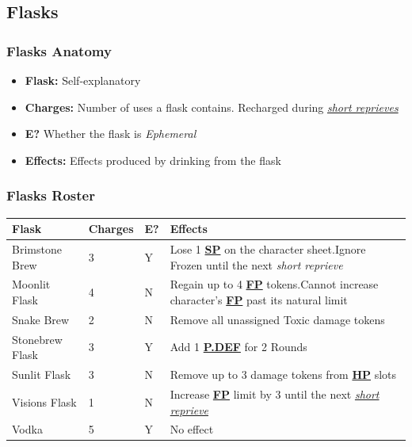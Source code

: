 \documentclass[12pt]{article}
\newcommand{\refto}[1]{\hyperlink{#1}{\textbf{#1}}}
\newcommand{\reftoit}[1]{\hyperlink{#1}{\emph{#1}}}
\begin{document}
\pagebreak

\subsection{Flasks}
\subsubsection*{Flasks Anatomy}
\begin{itemize}
\item \textbf{Flask:} Self-explanatory
\item \textbf{Charges:} Number of uses a flask contains. Recharged during \reftoit{short reprieves}
\item \textbf{E?} Whether the flask is \emph{Ephemeral}
\item \textbf{Effects:} Effects produced by drinking from the flask
\end{itemize}

\subsubsection*{Flasks Roster}
\begin{center}
\begin{tabularx}{\textwidth}{p{}p{}p{}p{}}
\hline
\rowcolor{white} \textbf{Flask} & \textbf{Charges} & \textbf{E?} & \textbf{Effects}\setcounter{rownum}{0}\\
\hline
Brimstone Brew & 3 & Y & Lose 1 \refto{SP} on the character sheet.\newline Ignore Frozen until the next \emph{short reprieve}\\
Moonlit Flask & 4 & N & Regain up to 4 \refto{FP} tokens.\newline Cannot increase character’s \refto{FP} past its natural limit \\
Snake Brew & 2 & N & Remove all unassigned Toxic damage tokens \\
Stonebrew Flask & 3 & Y & Add 1 \refto{P.DEF} for 2 Rounds \\
Sunlit Flask & 3 & N & Remove up to 3 damage tokens from \refto{HP} slots \\
Visions Flask & 1 & N & Increase \refto{FP} limit by 3 until the next \reftoit{short reprieve} \\
Vodka & 5 & Y & No effect \\
\hline
\end{tabularx}
\end{center}
\end{document}
